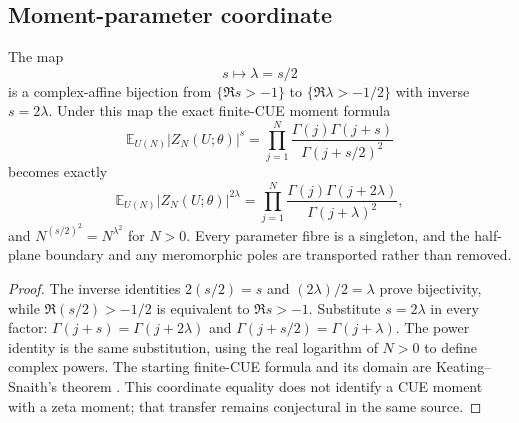 \subsection{Moment-parameter coordinate}

\begin{theorem}
\label{thm:ks-moment-coordinate-complete}
The map
\[
 s\longmapsto\lambda=s/2
\]
is a complex-affine bijection from $\{\Re s>-1\}$ to
$\{\Re\lambda>-1/2\}$ with inverse $s=2\lambda$.  Under this map the exact
finite-CUE moment formula
\[
 \mathbb E_{U(N)}|Z_N(U;\theta)|^s
 =\prod_{j=1}^N
 \frac{\Gamma(j)\Gamma(j+s)}{\Gamma(j+s/2)^2}
\]
becomes exactly
\[
 \mathbb E_{U(N)}|Z_N(U;\theta)|^{2\lambda}
 =\prod_{j=1}^N
 \frac{\Gamma(j)\Gamma(j+2\lambda)}{\Gamma(j+\lambda)^2},
\]
and $N^{(s/2)^2}=N^{\lambda^2}$ for $N>0$.  Every parameter fibre is a
singleton, and the half-plane boundary and any meromorphic poles are
transported rather than removed.
\end{theorem}

\begin{proof}
The inverse identities $2(s/2)=s$ and $(2\lambda)/2=\lambda$ prove bijectivity,
while $\Re(s/2)>-1/2$ is equivalent to $\Re s>-1$.  Substitute
$s=2\lambda$ in every factor:
$\Gamma(j+s)=\Gamma(j+2\lambda)$ and
$\Gamma(j+s/2)=\Gamma(j+\lambda)$.  The power identity is the same
substitution, using the real logarithm of $N>0$ to define complex powers.
The starting finite-CUE formula and its domain are Keating--Snaith's theorem
\cite[pp.~57--64, eqs.~(1), (6), and~(20)--(26)]{keatingSnaith2000}.
This coordinate equality does not identify a CUE moment with a zeta moment;
that transfer remains conjectural in the same source.
\end{proof}
